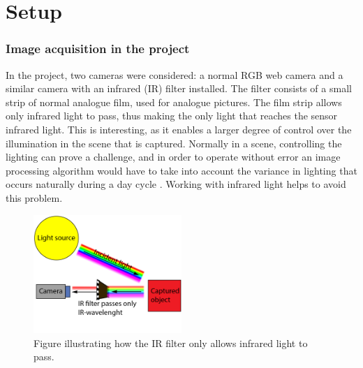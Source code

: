\chapter{Setup}


\subsection{Image acquisition in the project}
In the project, two cameras were considered: a normal RGB web camera and a similar camera with an infrared (IR) filter installed. The filter consists of a small strip of normal analogue film, used for analogue pictures. The film strip allows only infrared light to pass, thus making the only light that reaches the sensor infrared light. This is interesting, as it enables a larger degree of control over the illumination in the scene that is captured. Normally in a scene, controlling the lighting can prove a challenge, and in order to operate without error an image processing algorithm would have to take into account the variance in lighting that occurs naturally during a day cycle \citep{ip_book}. Working with infrared light helps to avoid this problem.


\begin{figure}[htbp] 
\centering 
\includegraphics[width=0.5\textwidth]{Pictures/Theory/IR_filter.png} 
\caption{Figure illustrating how the IR filter only allows infrared light to pass.} 
\label{fig:ir_filter} 
\end{figure}




